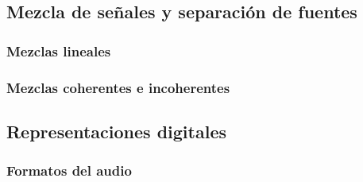 \documentclass[a4paper,11pt]{memoir}
\begin{document}
\subsection{Mezcla de señales y separación de fuentes}
             
\subsubsection{Mezclas lineales}

\subsubsection{Mezclas coherentes e incoherentes}

\subsection{Representaciones digitales}

\subsubsection{Formatos del audio}

%
\end{document}
